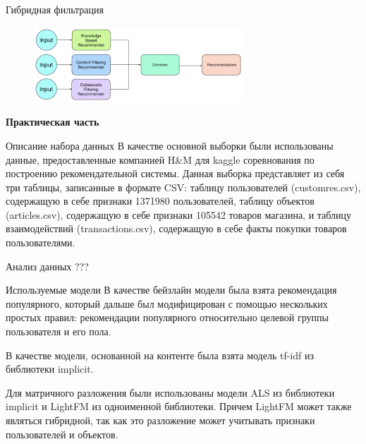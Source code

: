 \documentclass{beamer}
\begin{document}
\begin{frame}{Гибридная фильтрация}
  \begin{figure}[H]
    \centering
    \includegraphics[width=0.7\textwidth]{pic/4}
    \label{fig:img1}
  \end{figure}  
\end{frame}

\begin{frame}
  \begin{center}
    {\Huge \textbf{Практическая часть}}
  \end{center}  
\end{frame}

\begin{frame}{Описание набора данных}
  В качестве основной выборки были использованы данные, предоставленные компанией H\&M для kaggle соревнования по построению рекомендательной системы. Данная выборка
  представляет из себя три таблицы, записанные в формате CSV: таблицу пользователей (customres.csv), содержащую в себе признаки 1371980 пользователей, таблицу объектов (articles.csv),
  содержащую в себе признаки 105542 товаров магазина, и таблицу взаимодействий (transactions.csv), содержащую в себе факты покупки товаров пользователями.  
\end{frame}

\begin{frame}{Анализ данных}
  ???
\end{frame}

\begin{frame}{Используемые модели}
  В качестве бейзлайн модели была взята рекомендация популярного, который дальше был модифицирован с помощью нескольких простых правил:
  рекомендации популярного относительно целевой группы пользователя и его пола.

  В качестве модели, основанной на контенте была взята модель tf-idf из библиотеки implicit.

  Для матричного разложения были использованы модели ALS из библиотеки implicit и LightFM из одноименной библиотеки.
  Причем LightFM может также являться гибридной, так как это разложение может учитывать признаки пользователей и объектов. 
\end{frame}
\end{document}
